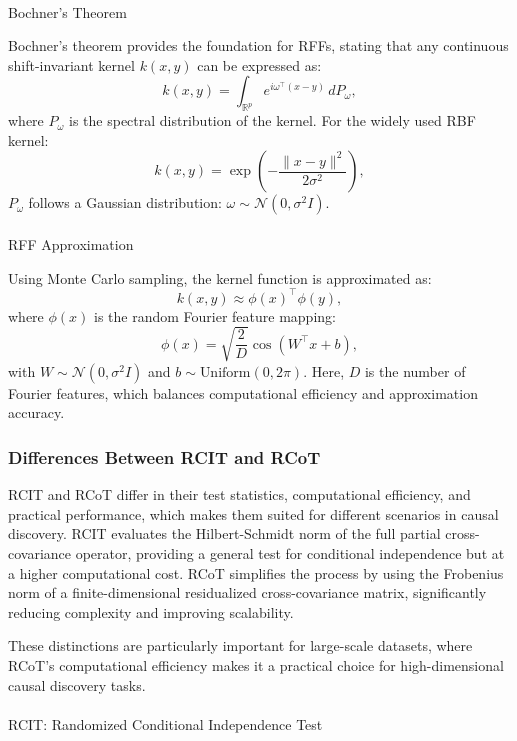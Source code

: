 \documentclass[
]{article}
\makeatletter
\let\oldparagraph\paragraph
\renewcommand{\paragraph}{
    \@ifstar
      \xxxParagraphStar
      \xxxParagraphNoStar
  }
\newcommand{\xxxParagraphStar}[1]{\oldparagraph*{#1}\mbox{}}
\newcommand{\xxxParagraphNoStar}[1]{\oldparagraph{#1}\mbox{}}
\makeatother
\begin{document}
\paragraph{Bochner's Theorem}\label{bochners-theorem}

Bochner's theorem provides the foundation for RFFs, stating that any
continuous shift-invariant kernel \(k(x, y)\) can be expressed as: \[
k(x, y) = \int_{\mathbb{R}^p} e^{i \omega^\top (x - y)} \, dP_\omega,
\] where \(P_\omega\) is the spectral distribution of the kernel. For
the widely used RBF kernel: \[
k(x, y) = \exp\left(-\frac{\|x - y\|^2}{2\sigma^2}\right),
\] \(P_\omega\) follows a Gaussian distribution:
\(\omega \sim \mathcal{N}(0, \sigma^2 I)\).

\paragraph{RFF Approximation}\label{rff-approximation}

Using Monte Carlo sampling, the kernel function is approximated as: \[
k(x, y) \approx \phi(x)^\top \phi(y),
\] where \(\phi(x)\) is the random Fourier feature mapping: \[
\phi(x) = \sqrt{\frac{2}{D}} \cos(W^\top x + b),
\] with \(W \sim \mathcal{N}(0, \sigma^2 I)\) and
\(b \sim \text{Uniform}(0, 2\pi)\). Here, \(D\) is the number of Fourier
features, which balances computational efficiency and approximation
accuracy.

\subsubsection{Differences Between RCIT and
RCoT}\label{differences-between-rcit-and-rcot}

RCIT and RCoT differ in their test statistics, computational efficiency,
and practical performance, which makes them suited for different
scenarios in causal discovery. RCIT evaluates the Hilbert-Schmidt norm
of the full partial cross-covariance operator, providing a general test
for conditional independence but at a higher computational cost. RCoT
simplifies the process by using the Frobenius norm of a
finite-dimensional residualized cross-covariance matrix, significantly
reducing complexity and improving scalability.

These distinctions are particularly important for large-scale datasets,
where RCoT's computational efficiency makes it a practical choice for
high-dimensional causal discovery tasks.

\paragraph{RCIT: Randomized Conditional Independence
Test}\label{rcit-randomized-conditional-independence-test}
\end{document}

